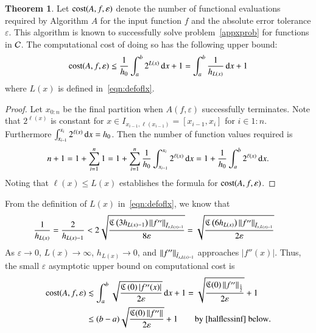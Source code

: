 \documentclass[review]{elsarticle}
\newcommand{\abstol}{\varepsilon}
\newcommand{\oton}{1\!:\!n}
\theoremstyle{definition}
\newtheorem{theorem}{Theorem}
\begin{document}
\begin{theorem}\label{thm:cost}
Let $\cost(A,f,\abstol)$ denote the number of functional evaluations required by
Algorithm $A$ for the input function $f$ and the absolute error tolerance
$\abstol$. This algorithm is known to successfully solve
problem~\eqref{appxprob} for functions in $\cc$. The computational cost of doing
so has the following upper bound:
\begin{equation*}
\cost(A,f,\abstol) \le \frac{1}{h_0}\int_a^b 2^{L(x)} \, \dif x +1 
= \int_a^b \frac{1}{h_{L(x)}} \, \dif x +1 \\
\end{equation*}
where $L(x)$ is defined in~\eqref{eqn:defoflx}.
\end{theorem}

\begin{proof}
Let $x_{0:n}$ be the final partition when $A(f,\abstol)$
successfully terminates. Note that $2^{\ell(x)}$ is constant for $x \in
I_{x_{i-1},\ell(x_{i-1})} = [x_{i-1},x_{i}]$ for $i \in \oton$. Furthermore
$\int_{x_{i-1}}^{x_{i}} 2^{\ell(x)} \, \dif x = h_0$. Then the number of
function values required is
\begin{equation*}
n+1 = 1 + \sum_{i=1}^{n} 1 = 1 + \sum_{i=1}^{n} \frac{1}{h_0} 
\int_{x_{i-1}}^{x_{i}} 2^{\ell(x)} \, \dif  x = 1 + \frac{1}{h_0}\int_a^b 2^{\ell(x)} \, \dif x.
\end{equation*}
Noting that $\ell(x) \le L(x)$ establishes the formula for $\cost(A,f,\abstol)$.
\end{proof}

From the definition of $L(x)$ in~\eqref{eqn:defoflx}, we know that 
\begin{align*}
\frac{1}{h_{L(x)}} = \frac{2}{h_{L(x)-1}}  
& < 2 \sqrt{\frac{\fC\left(3 h_{L(x)-1} \right)\norm[\bar{I}_{x,L(x)-1}]{f''} }{8\abstol}}  
= \sqrt{\frac{\fC\left(6 h_{L(x)} \right)\norm[\bar{I}_{x,L(x)-1}]{f''} }{2\abstol}}
\end{align*}
As $\abstol \to 0$, $L(x) \to \infty$, $h_{L(x)} \to 0$, and  $\norm[\bar{I}_{x,L(x)-1}]{f''}$ 
approaches $|f''(x)|$.  Thus, the small $\abstol$ asymptotic upper bound on 
computational cost is
\begin{align}
\cost(A,f,\abstol)  
&\lesssim \int_a^b \sqrt{\frac{\fC\left(0\right)   |f''(x)|}{2\abstol}} \, \dif x +1  
=\sqrt{\frac{\fC(0) \norm[\frac 12]{f''}}{2\abstol}} +1 \label{costbdapprox} \\
& \le (b-a)\sqrt{\frac{\fC(0) \norm{f''}}{2\abstol}} +1 \label{costbdinf}  \qquad 
\text{by \eqref{halflessinf} below}.
\end{align}
\end{document}
